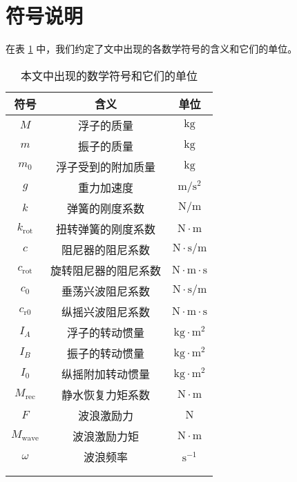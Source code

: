 \section{符号说明}

在表 \ref{symbols} 中，我们约定了文中出现的各数学符号的含义和它们的单位。

\begin{center}
    \begin{longtable}{ccc}
        \toprule
        符号 & 含义 & 单位 \\
        \midrule
        $M$ & 浮子的质量 & $\mathrm{kg}$ \\
        $m$ & 振子的质量 & $\mathrm{kg}$ \\
        $m_0$ & 浮子受到的附加质量 & $\mathrm{kg}$ \\
        $g$ & 重力加速度 & $\mathrm{m}/\mathrm{s}^2$ \\
        $k$ & 弹簧的刚度系数 & $\mathrm{N}/\mathrm{m}$ \\
        $k_\text{rot}$ & 扭转弹簧的刚度系数 & $\mathrm{N}\cdot\mathrm{m}$ \\
        $c$ & 阻尼器的阻尼系数 & $\mathrm{N}\cdot\mathrm{s}/\mathrm{m}$ \\
        $c_\text{rot}$ & 旋转阻尼器的阻尼系数 & $\mathrm{N}\cdot\mathrm{m}\cdot\mathrm{s}$ \\
        $c_0$ & 垂荡兴波阻尼系数 & $\mathrm{N}\cdot\mathrm{s}/\mathrm{m}$ \\ 
        $c_\text{r0}$ & 纵摇兴波阻尼系数 & $\mathrm{N}\cdot\mathrm{m}\cdot\mathrm{s}$ \\
        $I_A$ & 浮子的转动惯量 & $\mathrm{kg}\cdot\mathrm{m}^2$ \\
        $I_B$ & 振子的转动惯量 & $\mathrm{kg}\cdot\mathrm{m}^2$ \\
        $I_0$ & 纵摇附加转动惯量 & $\mathrm{kg}\cdot\mathrm{m}^2$ \\
        $M_\text{rec}$ & 静水恢复力矩系数 & $\mathrm{N}\cdot\mathrm{m}$ \\
        $F$ & 波浪激励力 & $\mathrm{N}$ \\
        $M_\text{wave}$ & 波浪激励力矩 & $\mathrm{N}\cdot\mathrm{m}$ \\
        $\omega$ & 波浪频率 & $\mathrm{s}^{-1}$ \\
        \bottomrule 
        \caption{本文中出现的数学符号和它们的单位} \\
        \label{symbols} \\
    \end{longtable}
\end{center}
